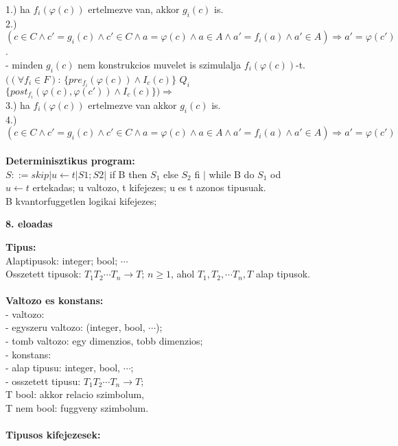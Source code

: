 \documentclass[a4paper,10pt]{article}
\begin{document}
1.) ha $f_i(\varphi(c))$ ertelmezve van, akkor $g_i(c)$ is.\\
2.) $(c\in C \wedge c'=g_i(c) \wedge c'\in C \wedge a=\varphi(c) \wedge a\in A \wedge a'=f_i(a) \wedge  a'\in A) \Rightarrow a'=\varphi(c')$.\\
- minden $g_i(c)$ nem konstrukcios muvelet is szimulalja $f_i(\varphi(c))$-t.\\
$((\forall f_i\in F)$: $\lbrace pre_{f_i} (\varphi(c))\wedge I_c(c)\rbrace$ $Q_i$ $\lbrace post_{f_i}(\varphi(c),\varphi(c')) \wedge I_c(c)\rbrace) \Rightarrow$\\
3.) ha $f_i(\varphi(c))$ ertelmezve van akkor $g_i(c)$ is.\\
4.) $(c\in C \wedge c'=g_i(c) \wedge c'\in C\wedge a=\varphi(c)\wedge a\in A\wedge a'=f_i(a)\wedge a'\in A) \Rightarrow a'=\varphi(c')$\\ \\
\textbf{Determinisztikus program:}\\
$S::=skip \vert u\gets t \vert S1;S2\vert$ if B then $S_1$ else $S_2$ fi $\vert$ while B do $S_1$ od\\
$u\gets t$ ertekadas; u valtozo, t kifejezes; u es t azonos tipusuak.\\
B kvantorfuggetlen logikai kifejezes;
\newpage
%
%
\begin{flushleft}
\textbf{8. eloadas}
\end{flushleft}
\textbf{Tipus:}\\
Alaptipusok: integer; bool; $\cdots$\\
Osszetett tipusok: $T_1 T_2 \cdots T_n \to T$; $n\ge1$, ahol $T_1, T_2, \cdots T_n, T$ alap tipusok.\\\\
\textbf{Valtozo es konstans:}\\
- valtozo:\\
\indent - egyszeru valtozo: (integer, bool, $\cdots$);\\
\indent - tomb valtozo: egy dimenzios, tobb dimenzios;\\
- konstans:\\
\indent - alap tipusu: integer, bool, $\cdots$;\\
\indent - osszetett tipusu: $T_1 T_2 \cdots T_n \to T$;\\
\indent \indent T bool: akkor relacio szimbolum,\\
\indent \indent T nem bool: fuggveny szimbolum.\\ \\
\textbf{Tipusos kifejezesek:}
\end{document}
